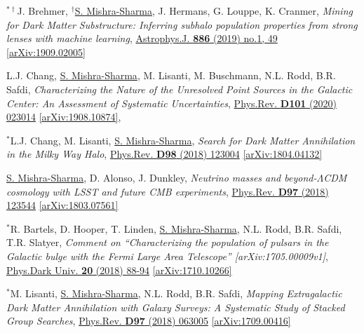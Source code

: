 \documentclass[letterpaper,11pt]{article}
\newenvironment{packed_enumerate}[1][]{
\begin{etaremune}[#1]
  \setlength{\itemsep}{3.7pt}
  \setlength{\parskip}{0pt}
  \setlength{\parsep}{0pt}}{\end{etaremune}
}
\begin{document}
\begin{packed_enumerate}[start=37]
  \item $^{*\dagger}$J. Brehmer, $^\dagger$\underline{S. Mishra-Sharma}, J. Hermans, G. Louppe, K. Cranmer, \emph{Mining for Dark Matter Substructure: Inferring subhalo population properties from strong lenses with machine learning}, \href{https://iopscience.iop.org/article/10.3847/1538-4357/ab4c41}{Astrophys.J. \textbf{886} (2019) no.1, 49} \href{https://arxiv.org/abs/1909.02005}{[arXiv:1909.02005]}

  \item L.J. Chang, \underline{S. Mishra-Sharma}, M. Lisanti, M. Buschmann, N.L. Rodd, B.R. Safdi, \emph{Characterizing the Nature of the Unresolved Point Sources in the Galactic Center: An Assessment of Systematic Uncertainties},  \href{https://journals.aps.org/prd/abstract/10.1103/PhysRevD.101.023014}{Phys.Rev. \textbf{D101} (2020) 023014} \href{https://arxiv.org/abs/1908.10874}{[arXiv:1908.10874]}, 

  \item $^*$L.J. Chang, M. Lisanti, \underline{S. Mishra-Sharma}, \emph{Search for Dark Matter Annihilation in the Milky Way Halo}, \href{https://journals.aps.org/prd/abstract/10.1103/PhysRevD.98.123004}{Phys.Rev. \textbf{D98} (2018) 123004} \href{https://arxiv.org/abs/1804.04132}{[arXiv:1804.04132]}

  \item \underline{S. Mishra-Sharma}, D. Alonso, J. Dunkley, \emph{Neutrino masses and beyond-$\Lambda$CDM cosmology with LSST and future CMB experiments}, \href{https://journals.aps.org/prd/abstract/10.1103/PhysRevD.97.123544}{Phys.Rev. \textbf{D97} (2018) 123544}  \href{https://arxiv.org/abs/1803.07561}{[arXiv:1803.07561]}

  \item $^*$R. Bartels, D. Hooper, T. Linden, \underline{S. Mishra-Sharma}, N.L. Rodd, B.R. Safdi, T.R. Slatyer, \emph{Comment on ``Characterizing the population of pulsars in the Galactic bulge with the
  {\it Fermi} Large Area Telescope'' [arXiv:1705.00009\MakeLowercase{v}1]}, \href{https://www.sciencedirect.com/science/article/pii/S2212686418300268}{Phys.Dark Univ. \textbf{20} (2018) 88-94} \href{https://arxiv.org/abs/1710.10266}{[arXiv:1710.10266]}

  \item $^*$M. Lisanti, \underline{S. Mishra-Sharma}, N.L. Rodd, B.R. Safdi, \emph{Mapping Extragalactic Dark Matter Annihilation with Galaxy Surveys: A Systematic Study of Stacked Group Searches},  \href{https://journals.aps.org/prd/abstract/10.1103/PhysRevD.97.063005}{Phys.Rev. \textbf{D97} (2018) 063005} \href{https://arxiv.org/abs/1709.00416}{[arXiv:1709.00416]}


\end{packed_enumerate}
\end{document}
